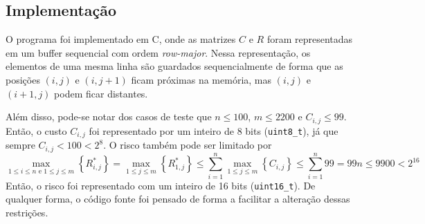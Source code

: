 \subsection{Implementação}

O programa foi implementado em C, onde as matrizes $C$ e $R$ foram representadas em um buffer sequencial com ordem \textit{row-major}. Nessa representação, os elementos de uma mesma linha são guardados sequencialmente de forma que as posições $(i, j)$ e $(i, j + 1)$ ficam próximas na memória, mas $(i, j)$ e $(i + 1, j)$ podem ficar distantes.

Além disso, pode-se notar dos casos de teste que $n \leq 100$, $m \leq 2200$ e $C_{i, j} \leq 99$. Então, o custo $C_{i, j}$ foi representado por um inteiro de 8 bits (\texttt{uint8\_t}), já que sempre $C_{i, j} < 100 < 2^8$. O risco também pode ser limitado por
\[
    \max_{1 \leq i \leq n \text{~e~} 1 \leq j \leq m} \left\{R^*_{i, j}\right\} = \max_{1 \leq j \leq m} \left\{R^*_{1, j}\right\} \leq \sum_{i = 1}^n \max_{1 \leq j \leq m}\left\{C_{i, j}\right\} \leq \sum_{i = 1}^n 99 = 99 n \leq 9900 < 2^{16}
\]
Então, o risco foi representado com um inteiro de 16 bits (\texttt{uint16\_t}). De qualquer forma, o código fonte foi pensado de forma a facilitar a alteração dessas restrições.

